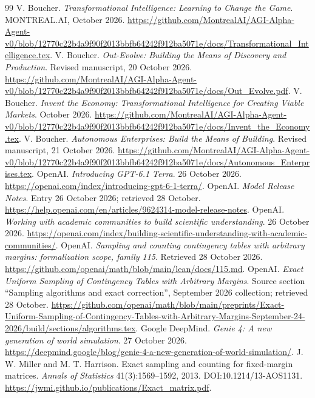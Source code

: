 \documentclass[11pt,letterpaper]{article}
\begin{document}
\small
\begin{thebibliography}{99}
 V. Boucher. \emph{Transformational Intelligence: Learning to Change the Game}. MONTREAL.AI, October 2026. \url{https://github.com/MontrealAI/AGI-Alpha-Agent-v0/blob/12770c22b4a9f90f2013bbfb64242f912ba5071e/docs/Transformational_Intelligence.tex}.
 V. Boucher. \emph{Out-Evolve: Building the Means of Discovery and Production}. Revised manuscript, 20 October 2026. \url{https://github.com/MontrealAI/AGI-Alpha-Agent-v0/blob/12770c22b4a9f90f2013bbfb64242f912ba5071e/docs/Out_Evolve.pdf}.
 V. Boucher. \emph{Invent the Economy: Transformational Intelligence for Creating Viable Markets}. October 2026. \url{https://github.com/MontrealAI/AGI-Alpha-Agent-v0/blob/12770c22b4a9f90f2013bbfb64242f912ba5071e/docs/Invent_the_Economy.tex}.
 V. Boucher. \emph{Autonomous Enterprises: Build the Means of Building}. Revised manuscript, 21 October 2026. \url{https://github.com/MontrealAI/AGI-Alpha-Agent-v0/blob/12770c22b4a9f90f2013bbfb64242f912ba5071e/docs/Autonomous_Enterprises.tex}.
 OpenAI. \emph{Introducing GPT-6.1 Terra}. 26 October 2026. \url{https://openai.com/index/introducing-gpt-6-1-terra/}.
 OpenAI. \emph{Model Release Notes}. Entry 26 October 2026; retrieved 28 October. \url{https://help.openai.com/en/articles/9624314-model-release-notes}.
 OpenAI. \emph{Working with academic communities to build scientific understanding}. 26 October 2026. \url{https://openai.com/index/building-scientific-understanding-with-academic-communities/}.
 OpenAI. \emph{Sampling and counting contingency tables with arbitrary margins: formalization scope, family 115}. Retrieved 28 October 2026. \url{https://github.com/openai/math/blob/main/lean/docs/115.md}.
 OpenAI. \emph{Exact Uniform Sampling of Contingency Tables with Arbitrary Margins}. Source section ``Sampling algorithms and exact correction'', September 2026 collection; retrieved 28 October. \url{https://github.com/openai/math/blob/main/preprints/Exact-Uniform-Sampling-of-Contingency-Tables-with-Arbitrary-Margins-September-24-2026/build/sections/algorithms.tex}.
 Google DeepMind. \emph{Genie 4: A new generation of world simulation}. 27 October 2026. \url{https://deepmind.google/blog/genie-4-a-new-generation-of-world-simulation/}.
 J. W. Miller and M. T. Harrison. Exact sampling and counting for fixed-margin matrices. \emph{Annals of Statistics} 41(3):1569--1592, 2013. DOI:10.1214/13-AOS1131. \url{https://jwmi.github.io/publications/Exact_matrix.pdf}.

\end{thebibliography}
\end{document}
